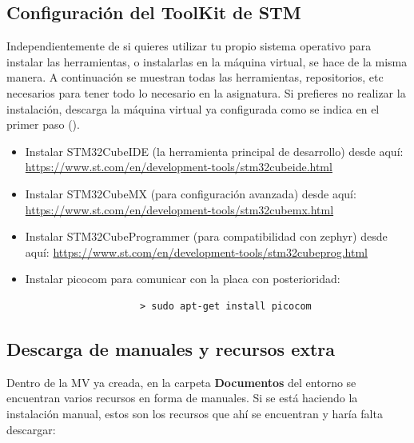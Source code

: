 \documentclass[../main.tex]{subfiles}
\begin{document}
    \subsection{Configuración del ToolKit de STM}\label{sub:toolkitsetup}
        Independientemente de si quieres utilizar tu propio sistema operativo para instalar las herramientas, o instalarlas en la máquina virtual, se hace de la misma manera. A continuación se muestran todas las herramientas, repositorios, etc necesarios para tener todo lo necesario en la asignatura. Si prefieres no realizar la instalación, descarga la máquina virtual ya configurada como se indica en el primer paso ().

        \begin{itemize}
            \item Instalar STM32CubeIDE (la herramienta principal de desarrollo) desde aquí: \url{https://www.st.com/en/development-tools/stm32cubeide.html}
            \item Instalar STM32CubeMX (para configuración avanzada) desde aquí: \url{https://www.st.com/en/development-tools/stm32cubemx.html}
            \item Instalar STM32CubeProgrammer (para compatibilidad con zephyr) desde aquí: \url{https://www.st.com/en/development-tools/stm32cubeprog.html}
            \item Instalar picocom para comunicar con la placa con posterioridad:
                \begin{lstlisting}
                    > sudo apt-get install picocom
                \end{lstlisting}
        \end{itemize}

    \subsection{Descarga de manuales y recursos extra}
        Dentro de la MV ya creada, en la carpeta \textbf{Documentos} del entorno se encuentran varios recursos en forma de manuales. Si se está haciendo la instalación manual, estos son los recursos que ahí se encuentran y haría falta descargar:
\end{document}
